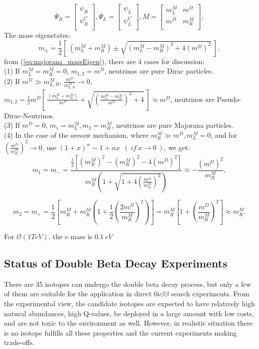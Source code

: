 \begin{equation}\label{eq:majoranaField}
\Psi_R=\begin{bmatrix}
\psi_R\\
\psi_R^C\\
\end{bmatrix},
\Psi_L=\begin{bmatrix}
\psi_L\\
\psi_L^C\\
\end{bmatrix},
M=\begin{bmatrix}
m_L^M &  m^D\\
m^D &  m_R^M\\
\end{bmatrix},
\end{equation}
%
The mass eigenstates:
\[
m_{\pm} = \frac{1}{2}[~(m_L^M+m_R^M)\pm\sqrt{(m_L^M-m_R^M)^2+4(m^D)^2}~]\label{eq:majorana_massEigen},
\]
from (\ref{eq:majorana_massEigen}), there are 4 cases for discussion:\\
(1) If $m_L^M=m_R^M=0$, $m_{1,2}=m^D$, neutrinos are pure Dirac particles.\\
(2) If $m^D\gg m^M_{L,R}$, $\frac{m^D}{m_{L,R}^M}\to 0$, $m_{1,2}=\frac{1}{2}m^D[~\frac{(m_L^M+m_R^M)}{m^D}+\sqrt{(\frac{m^M_L-m^M_R}{m^D})^2+4}~]\approx m^D$, neutrinos are Pseudo-Dirac-Neutrinos.
\\
(3) If $m^D=0$, $m_1=m^M_L, m_2=m^M_R$, neutrinos are pure Majorana particles.\\
(4) In the case of the seesaw mechanism, where $m_R^M\gg m^D, m_L^M=0$,
and for $(\frac{m^D}{m_R^M})^2\to 0$, use $(1+x)^\alpha\sim 1+\alpha x ~~(~if~x\to 0~)$, we get:
\[
m_1=m_-=\frac{\frac{1}{2}[(m^M_R)^2-(m^M_R)^2-4(m^D)^2]}{m_R^M(1+\sqrt{1+4(\frac{m^D}{m^M_R})^2})}\approx -\frac{(m^D)^2}{m^M_R},
\]

\[
m_2=m_+=\frac{1}{2}[m^M_R+m^M_R(1+\frac{1}{2}(\frac{2m^D}{m^M_R})^2)]=m^M_R[1+(\frac{m^D}{m^M_R})^2]\approx m^M_R.
\]


For $\mathcal{O}(1TeV)$, the $\nu$ mass is $0.1~eV$












\subsection{Status of Double Beta Decay Experiments}

There are 35 isotopes can undergo the double beta decay process, but only a few of them are suitable for the application in direct $0\nu\beta\beta$ search experiments\cite{giunti2007fundamentals}. From the experimental view, the candidate isotopes are expected to have relatively high natural abundances, high Q-values, be deployed in a large amount with low costs, and are not toxic to the environment as well. However, in realistic situation there is no isotope fulfills all these properties and the current experiments making trade-offs\cite{dolinski2019neutrinoless}.

